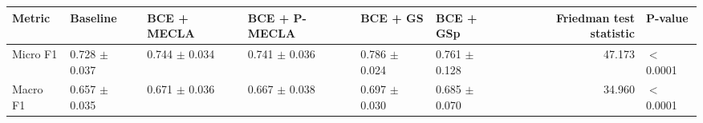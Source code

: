 \begin{tabular}{llllllrl}
\toprule
Metric & Baseline & BCE + MECLA & BCE + P-MECLA & BCE + GS & BCE + GSp & Friedman test statistic & P-value \\
\midrule
Micro F1 & 0.728 $\pm$ 0.037 & 0.744 $\pm$ 0.034 & 0.741 $\pm$ 0.036 & 0.786 $\pm$ 0.024 & 0.761 $\pm$ 0.128 & 47.173 & $<$0.0001 \\
Macro F1 & 0.657 $\pm$ 0.035 & 0.671 $\pm$ 0.036 & 0.667 $\pm$ 0.038 & 0.697 $\pm$ 0.030 & 0.685 $\pm$ 0.070 & 34.960 & $<$0.0001 \\
\bottomrule
\end{tabular}
